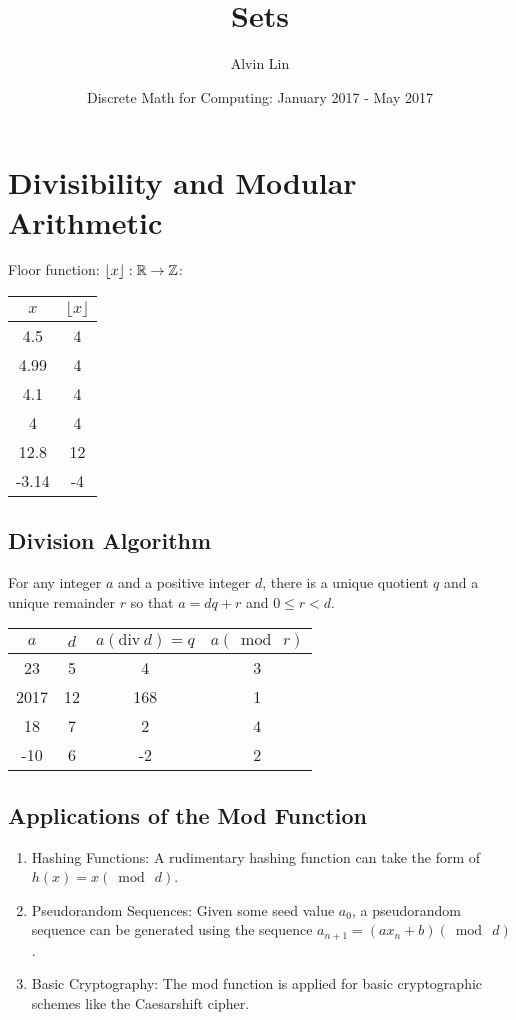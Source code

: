 \documentclass[letterpaper, 12pt]{math}
\title{Sets}
\author{Alvin Lin}
\date{Discrete Math for Computing: January 2017 - May 2017}
\begin{document}
\maketitle

\section*{Divisibility and Modular Arithmetic}
Floor function: \( \lfloor x\rfloor:\mathbb{R}\to\mathbb{Z} \):
\begin{center}
  \begin{tabular}{|c|c|}
    \hline
    \( x \) & \( \lfloor x\rfloor \) \\
    \hline
    4.5 & 4 \\
    \hline
    4.99 & 4 \\
    \hline
    4.1 & 4 \\
    \hline
    4 & 4 \\
    \hline
    12.8 & 12 \\
    \hline
    -3.14 & -4 \\
    \hline
  \end{tabular}
\end{center}

\subsection*{Division Algorithm}
For any integer \( a \) and a positive integer \( d \), there is a unique
quotient \( q \) and a unique remainder \( r \) so that \( a = dq+r \) and
\( 0\leq r<d \).
\begin{center}
  \begin{tabular}{|c|c|c|c|}
    \hline
    \( a \) & \( d \) & \( a(\mathrm{div}\ d) = q \) & \( a(\bmod\ r) \) \\
    \hline
    23 & 5 & 4 & 3 \\
    \hline
    2017 & 12 & 168 & 1 \\
    \hline
    18 & 7 & 2 & 4 \\
    \hline
    -10 & 6 & -2 & 2 \\
    \hline
  \end{tabular}
\end{center}

\subsection*{Applications of the Mod Function}
\begin{enumerate}
  \item Hashing Functions: A rudimentary hashing function can take the form of
    \( h(x) = x(\bmod\ d) \).
  \item Pseudorandom Sequences: Given some seed value \( a_{0} \), a
    pseudorandom sequence can be generated using the sequence
    \( a_{n+1} = (ax_{n}+b) (\bmod\ d) \).
  \item Basic Cryptography: The mod function is applied for basic cryptographic
    schemes like the Caesarshift cipher.
\end{enumerate}
\end{document}

